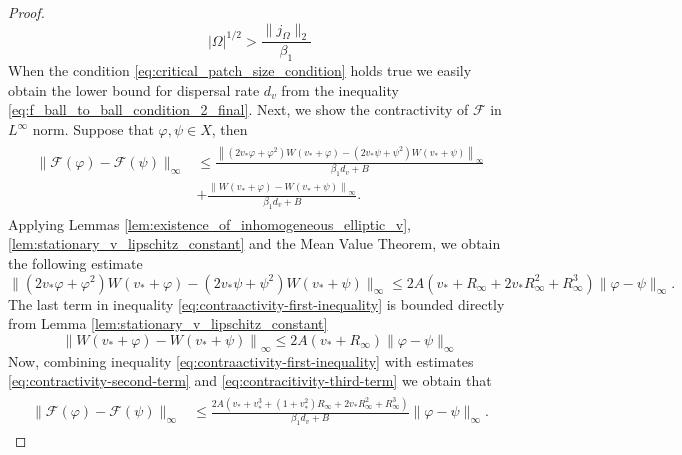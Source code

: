 \documentclass[11pt, a4paper]{article}
\theoremstyle{break}
\theoremstyle{break}
\theoremstyle{break}
\theoremstyle{break}
\theoremstyle{break}
\theoremstyle{break}
\theoremstyle{break}
\begin{document}
\begin{proof}
\begin{equation}
        \label{eq:critical_patch_size_condition}
        |\Omega|^{1/2} > \frac{\|j_\Omega\|_2}{\beta_1}
    \end{equation}
    When the condition \eqref{eq:critical_patch_size_condition} holds true we easily obtain the lower bound for dispersal rate $d_v$ from the inequality \eqref{eq:f_ball_to_ball_condition_2_final}.
    Next, we show the contractivity of $\mathcal{F}$ in $L^\infty$ norm. Suppose that $\varphi, \psi \in X$, then
    \begin{align}
        \label{eq:contraactivity-first-inequality}
        \begin{split}
            \|\mathcal{F}(\varphi) - \mathcal{F}(\psi)\|_\infty
            &\leq
            \frac{\left\|(2v_* \varphi + \varphi^2) W(v_* + \varphi)
            - (2v_* \psi + \psi^2) W(v_* + \psi) \right\|_\infty}{\beta_1 d_v + B} \\
            &+ \frac{ \left\| W(v_* + \varphi) - W(v_* + \psi) \right\|_\infty}{\beta_1 d_v + B}.
        \end{split}
    \end{align}
    Applying Lemmas \ref{lem:existence_of_inhomogeneous_elliptic_v}, \ref{lem:stationary_v_lipschitz_constant} and the Mean Value Theorem, we obtain the following estimate 
    \begin{equation}
        \label{eq:contractivity-second-term}
        \|(2v_*\varphi + \varphi^2)W(v_* + \varphi) - (2v_*\psi + \psi^2)W(v_* + \psi)\|_\infty \leq 
        2A
        \left( v_* + R_\infty + 2 v_* R_\infty^2 + R_\infty^3 \right) \|\varphi - \psi\|_\infty.
    \end{equation}
    The last term in inequality \eqref{eq:contraactivity-first-inequality} is bounded directly from Lemma \ref{lem:stationary_v_lipschitz_constant}
    \begin{equation}
        \label{eq:contracitivity-third-term}
        \left\| W(v_* + \varphi) - W(v_* + \psi) \right\|_\infty
        \leq
        2A(v_* + R_\infty)\|\varphi - \psi\|_\infty
    \end{equation}
    Now, combining inequality \eqref{eq:contraactivity-first-inequality} with estimates \eqref{eq:contractivity-second-term} and \eqref{eq:contracitivity-third-term} we obtain that
    \begin{align}
        \label{eq:contractivity-final-inequality}
        \begin{split}
            \|\mathcal{F}(\varphi) - \mathcal{F}(\psi)\|_\infty
            &\leq
            \frac{2A
        \left( v_* + v_*^3 + (1 + v_*^2)R_\infty + 2 v_* R_\infty^2 + R_\infty^3\right)}{\beta_1 d_v + B} \|\varphi - \psi\|_\infty.

\end{split}
\end{align}
\end{proof}
\end{document}
